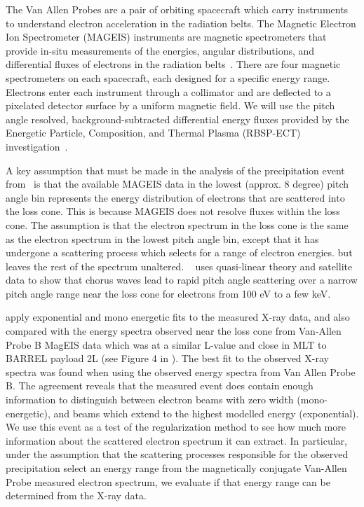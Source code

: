The Van Allen Probes are a pair of orbiting spacecraft which carry instruments to understand electron acceleration in the radiation belts. The Magnetic Electron Ion Spectrometer (MAGEIS) instruments are magnetic spectrometers that provide in-situ measurements of the energies, angular distributions, and differential fluxes of electrons in the radiation belts~\cite{Blake2013,Spence2014}. There are four magnetic spectrometers on each spacecraft, each designed for a specific energy range. Electrons enter each instrument through a collimator and are deflected to a pixelated detector surface by a uniform magnetic field. We will use the pitch angle resolved, background-subtracted differential energy fluxes provided by the Energetic Particle, Composition, and Thermal Plasma (RBSP-ECT) investigation~\cite{Spence2013}.

A key assumption that must be made in the analysis of the precipitation event from~\cite{Halford2015} is that the available MAGEIS data in the lowest (approx. 8 degree)  pitch angle bin represents the energy distribution of electrons that are scattered into the loss cone. This is because MAGEIS does not resolve fluxes within the loss cone. The assumption is that the electron spectrum in the loss cone is the same as the electron spectrum in the lowest pitch angle bin, except that it has undergone a scattering process which selects for a range of electron energies. but leaves the rest of the spectrum unaltered. ~\cite{Thorne2010} uses quasi-linear theory and satellite data to show that chorus waves lead to rapid pitch angle scattering over a narrow pitch angle range near the loss cone for electrons from 100 eV to a few keV. 

 \cite{Halford2015} apply exponential and mono energetic fits to the measured X-ray data, and also compared with the energy spectra observed near the loss cone from Van-Allen Probe B MagEIS data which was at a similar L-value and close in MLT to BARREL payload 2L (see Figure 4 in \cite{Halford2015}). The best fit to the observed X-ray spectra was found when using the observed energy spectra from Van Allen Probe B. The agreement reveals that the measured event does contain enough information to distinguish between electron beams with zero width (mono-energetic), and beams which extend to the highest modelled energy (exponential). We use this event as a test of the regularization method to see how much more information about the scattered electron spectrum it can extract. In particular, under the assumption that the scattering processes responsible for the observed precipitation select an energy range from the magnetically conjugate Van-Allen Probe measured electron spectrum, we evaluate if that energy range can be determined from the X-ray data. 

